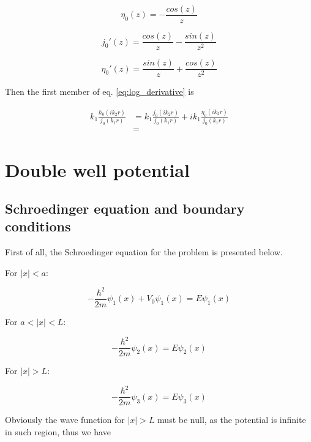 \documentclass{article}
\begin{document}
\begin{equation}
\eta_0(z) = - \frac{cos(z)}{z}
\end{equation}

\begin{equation}
j_0'(z) = \frac{cos(z)}{z} -  \frac{sin(z)}{z^2}
\end{equation}

\begin{equation}
\eta_0'(z) = \frac{sin(z)}{z} + \frac{cos(z)}{z^2}
\end{equation}

Then the first member of eq. \eqref{eq:log_derivative} is

\begin{align}
k_1 \frac{h_0(ik_2r)}{j_0(k_1r)} & = k_1 \frac{j_0(ik_2r)}{j_0(k_1r)} + i k_1 \frac{\eta_0(ik_2r)}{j_0(k_1r)} \nonumber \\
& =
\end{align}

\section{Double well potential}

\subsection{Schroedinger equation and boundary conditions}
First of all, the Schroedinger equation for the problem is presented below.

For \(\left|x\right| < a\):

\begin{equation}
\label{eq:schr1}
-\frac{\hbar^2}{2m}\psi_{1}(x) + V_{0}\psi_{1}(x) = E\psi_{1}(x)
\end{equation}

For \(a < \left|x\right| < L\):

\begin{equation}
\label{eq:schr2}
-\frac{\hbar^2}{2m}\psi_{2}(x) = E\psi_{2}(x)
\end{equation}

For \(\left|x\right| > L\):

\begin{equation}
\label{eq:schr3}
-\frac{\hbar^2}{2m}\psi_{3}(x) = E\psi_{3}(x)
\end{equation}

Obviously the wave function for \(\left|x\right| > L\) must be null, as the potential is infinite in such region, thus we have
\end{document}
